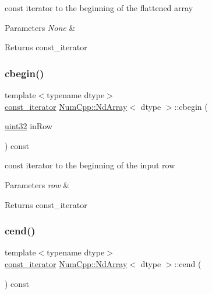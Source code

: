 const iterator to the beginning of the flattened array


\begin{DoxyParams}{Parameters}
{\em None} & \\
\hline
\end{DoxyParams}
\begin{DoxyReturn}{Returns}
const\+\_\+iterator 
\end{DoxyReturn}
\mbox{\label{class_num_cpp_1_1_nd_array_a9b153131ee4404b83085c3f36a69ef97}} 
\subsubsection{\texorpdfstring{cbegin()}{cbegin()}\hspace{0.1cm}{\footnotesize\ttfamily [2/2]}}
{\footnotesize\ttfamily template$<$typename dtype$>$ \\
\mbox{\hyperlink{class_num_cpp_1_1_nd_array_a770eaf3b67efaa19e310ed14eee5aabb}{const\+\_\+iterator}} \mbox{\hyperlink{class_num_cpp_1_1_nd_array}{Num\+Cpp\+::\+Nd\+Array}}$<$ dtype $>$\+::cbegin (\begin{DoxyParamCaption}\item[{\mbox{\hyperlink{namespace_num_cpp_a36f388e948380413c63011cab9b7fbd5}{uint32}}}]{in\+Row }\end{DoxyParamCaption}) const\hspace{0.3cm}{\ttfamily [inline]}}

const iterator to the beginning of the input row


\begin{DoxyParams}{Parameters}
{\em row} & \\
\hline
\end{DoxyParams}
\begin{DoxyReturn}{Returns}
const\+\_\+iterator 
\end{DoxyReturn}
\mbox{\label{class_num_cpp_1_1_nd_array_a3ac81391c206391368f0db78381922a2}} 
\subsubsection{\texorpdfstring{cend()}{cend()}\hspace{0.1cm}{\footnotesize\ttfamily [1/2]}}
{\footnotesize\ttfamily template$<$typename dtype$>$ \\
\mbox{\hyperlink{class_num_cpp_1_1_nd_array_a770eaf3b67efaa19e310ed14eee5aabb}{const\+\_\+iterator}} \mbox{\hyperlink{class_num_cpp_1_1_nd_array}{Num\+Cpp\+::\+Nd\+Array}}$<$ dtype $>$\+::cend (\begin{DoxyParamCaption}{ }\end{DoxyParamCaption}) const\hspace{0.3cm}{\ttfamily [inline]}}

